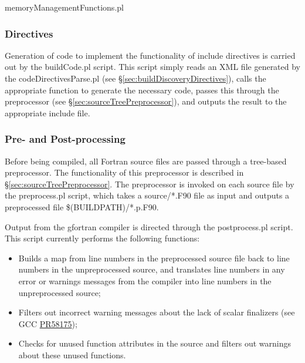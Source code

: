 {\normalfont \ttfamily memoryManagementFunctions.pl}
 
\subsubsection{Directives}\label{sec:codeBuildIncludeDirectives}

Generation of code to implement the functionality of {\normalfont \ttfamily include} directives is carried out by the {\normalfont \ttfamily buildCode.pl} script. This script simply reads an XML file generated by the {\normalfont \ttfamily codeDirectivesParse.pl} (see \S\ref{sec:buildDiscoveryDirectives}), calls the appropriate function to generate the necessary code, passes this through the preprocessor (see \S\ref{sec:sourceTreePreprocessor}), and outputs the result to the appropriate include file.

\subsubsection{Pre- and Post-processing}\label{sec:codeBuildPrePostProcess}

Before being compiled, all Fortran source files are passed through a tree-based preprocessor. The functionality of this preprocessor is described in \S\ref{sec:sourceTreePreprocessor}. The preprocessor is invoked on each source file by the {\normalfont \ttfamily preprocess.pl} script, which takes a {\normalfont \ttfamily source/*.F90} file as input and outputs a preprocessed file {\normalfont \ttfamily \$(BUILDPATH)/*.p.F90}.

Output from the {\normalfont \ttfamily gfortran} compiler is directed through the {\normalfont \ttfamily postprocess.pl} script. This script currently performs the following functions:
\begin{itemize}
\item Builds a map from line numbers in the preprocessed source file back to line numbers in the unpreprocessed source, and translates line numbers in any error or warnings messages from the compiler into line numbers in the unpreprocessed source;
\item Filters out incorrect warning messages about the lack of scalar finalizers (see GCC \href{https://gcc.gnu.org/bugzilla/show_bug.cgi?id=58175}{PR58175});
\item Checks for unused function attributes in the source and filters out warnings about these unused functions.
\end{itemize}

